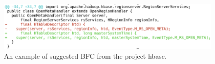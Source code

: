 \begin{figure}[!tbp]
\renewcommand{\arraystretch}{1}
    \centering
    \includegraphics[width=\linewidth]{figures/ps2.png}\hfill
    \caption{An example of suggested BFC from the project hbase.}
    \label{fig:ps_2}
\end{figure}